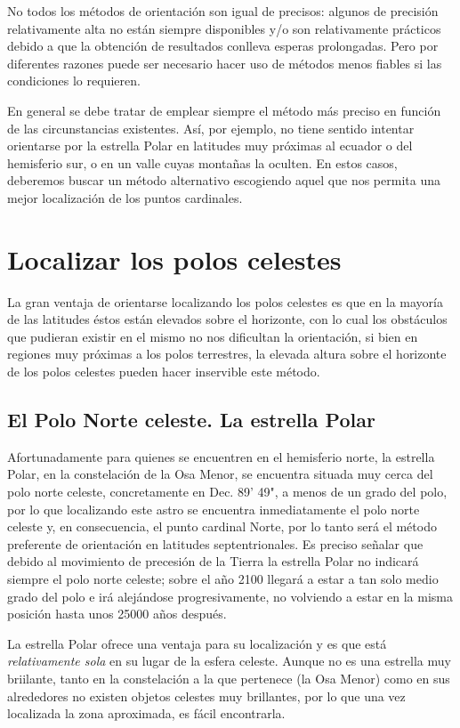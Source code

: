 \documentclass[10pt,a5paper,twoside]{amsbook}
\begin{document}
No todos los métodos de orientación son igual de precisos: algunos de precisión relativamente alta no están siempre disponibles y/o son relativamente prácticos debido a que la obtención de resultados conlleva esperas prolongadas. Pero por diferentes razones puede ser necesario hacer uso de métodos menos fiables si las condiciones lo requieren. 

En general se debe tratar de emplear siempre el método más preciso en función de las circunstancias existentes. Así, por ejemplo, no tiene sentido intentar orientarse por la estrella Polar en latitudes muy próximas al ecuador o del hemisferio sur, o en un valle cuyas montañas la oculten. En estos casos, deberemos buscar un método alternativo escogiendo aquel que nos permita una mejor localización de los puntos cardinales.

\section{Localizar los polos celestes}

La gran ventaja de orientarse localizando los polos celestes es que en la mayoría de las latitudes éstos están elevados sobre el horizonte, con lo cual los obstáculos que pudieran existir en el mismo no nos dificultan la orientación, si bien en regiones muy próximas a los polos terrestres, la elevada altura sobre el horizonte de los polos celestes pueden hacer inservible este método.

\subsection{El Polo Norte celeste. La estrella Polar}

Afortunadamente para quienes se encuentren en el hemisferio norte, la estrella Polar, en la constelación de la Osa Menor, se encuentra situada muy cerca del polo norte celeste, concretamente en Dec. 89' 49", a menos de un grado del polo, por lo que localizando este astro se encuentra inmediatamente el polo norte celeste y, en consecuencia, el punto cardinal Norte, por lo tanto será el método preferente de orientación en latitudes septentrionales. Es preciso señalar que debido al movimiento de precesión de la Tierra la estrella Polar no indicará siempre el polo norte celeste; sobre el año 2100 llegará a estar a tan solo medio grado del polo e irá alejándose progresivamente, no volviendo a estar en la misma posición hasta unos 25000 años después.

La estrella Polar ofrece una ventaja para su localización y es que está \textit{relativamente sola} en su lugar de la esfera celeste. Aunque no es una estrella muy briilante, tanto en la constelación a la que pertenece (la Osa Menor) como en sus alrededores no existen objetos celestes muy brillantes, por lo que una vez localizada la zona aproximada, es fácil encontrarla.
\end{document}
